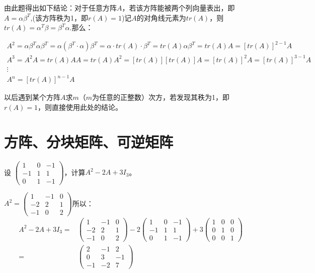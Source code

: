 \documentclass[a4paper]{report}
\begin{document}
\begin{tips}
由此题得出如下结论：对于任意方阵$A$，若该方阵能被两个列向量表出，即$A=\alpha\beta^T$,(该方阵秩为1，即$r(A)=1$)记$A$的对角线元素为$tr(A)$，则$tr(A)=\alpha^T\beta=\beta^T\alpha$.那么：

\begin{gather*}
A^2=\alpha\beta^T\alpha\beta^T=\alpha(\beta^T\cdot\alpha)\beta^T=\alpha\cdot tr(A)\cdot\beta^T=tr(A)\alpha\beta^T=tr(A)A=[tr(A)]^{2-1}A\\
A^3=A^2A=tr(A)AA=tr(A)A^2=[tr(A)][tr(A)]A=[tr(A)]^2A=[tr(A)]^{3-1}A\\
\vdots\\
A^n=[tr(A)]^{n-1}A
\end{gather*}

以后遇到某个方阵$A$求$m$（$m$为任意的正整数）次方，若发现其秩为1，即$r(A)=1$，则直接使用此处的结论。
\end{tips}
\clearpage
\section{方阵、分块矩阵、可逆矩阵}

\EX 设
$
\begin{pmatrix}
1&0&-1\\ -1&1&1\\ 0&1&-1
\end{pmatrix}
$，计算$A^2-2A+3I_{3}$。

\begin{jie}
$A^2=\begin{pmatrix}
1&-1&0\\ -2&2&1\\ -1&0&2
\end{pmatrix}$所以：
\begin{align*}
A^2-2A+3I_{3}=&\begin{pmatrix}
1&-1&0\\ -2&2&1\\ -1&0&2
\end{pmatrix}-2\begin{pmatrix}
1&0&-1\\ -1&1&1\\ 0&1&-1
\end{pmatrix}+3\begin{pmatrix}
1&0&0\\ 0&1&0\\ 0&0&1
\end{pmatrix}\\
=&\begin{pmatrix}
2&-1&2\\ 0&3&-1\\ -1&-2&7
\end{pmatrix}
\end{align*}
\end{jie}
\end{document}

